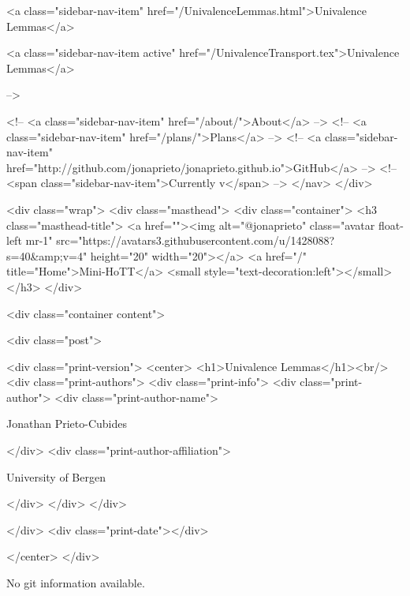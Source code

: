       
    
      
        
          <a class="sidebar-nav-item" href="/UnivalenceLemmas.html">Univalence Lemmas</a>
        
      
    
      
        
          <a class="sidebar-nav-item active" href="/UnivalenceTransport.tex">Univalence Lemmas</a>
        
      
     -->

    <!-- <a class="sidebar-nav-item" href="/about/">About</a> -->
    <!-- <a class="sidebar-nav-item" href="/plans/">Plans</a> -->
    <!-- <a class="sidebar-nav-item" href="http://github.com/jonaprieto/jonaprieto.github.io">GitHub</a> -->
    <!-- <span class="sidebar-nav-item">Currently v</span> -->
  </nav>
</div>

    <div class="wrap">
      <div class="masthead">
        <div class="container">
          <h3 class="masthead-title">
            <a href=""><img alt="@jonaprieto" class="avatar float-left mr-1" src="https://avatars3.githubusercontent.com/u/1428088?s=40&amp;v=4" height="20" width="20"></a>
            <a href="/" title="Home">Mini-HoTT</a>
            <small style="text-decoration:left"></small>
          </h3>
        </div>
      
      <div class="container content">
        







<div class="post">

  <div class="print-version">
    <center>
      <h1>Univalence Lemmas</h1><br/>
        <div class="print-authors">
          <div class="print-info">
            <div class="print-author">
              <div class="print-author-name">
                
                  Jonathan Prieto-Cubides
                
              </div>
              <div class="print-author-affiliation">
                
                  University of Bergen
                
                </div>
            </div>
          </div>
          
          
        </div>
        <div class="print-date"></div>
        
        
    </center>
  </div>

  
  No git information available.
  
